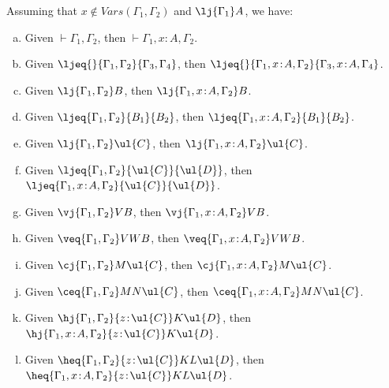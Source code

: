 \begin{theorem}[Weakening] 
\label{thm:weakening}
Assuming that $x \not\in V\!ars(\Gamma_1,\Gamma_2)$ and $\lj {\Gamma_1} A$, we have:
\label{thm:weakening}
\begin{enumerate}[(a)]
\item Given $\vdash {\Gamma_1,\Gamma_2}$, then $\vdash {\Gamma_1,x \!:\! A,\Gamma_2}$.
\item Given $\ljeq{} {\Gamma_1,\Gamma_2} {\Gamma_3,\Gamma_4}$, then $\ljeq {} {\Gamma_1,x \!:\! A,\Gamma_2} {\Gamma_3,x \!:\! A,\Gamma_4}$.
\item Given $\lj {\Gamma_1,\Gamma_2} B$, then $\lj {\Gamma_1,x \!:\! A,\Gamma_2} B$.
\item Given $\ljeq {\Gamma_1,\Gamma_2} {B_1} {B_2}$, then $\ljeq {\Gamma_1,x \!:\! A,\Gamma_2} {B_1} {B_2}$.
\item Given $\lj {\Gamma_1,\Gamma_2} \ul{C}$, then $\lj {\Gamma_1,x \!:\! A,\Gamma_2} \ul{C}$.
\item Given $\ljeq {\Gamma_1,\Gamma_2} {\ul{C}} {\ul{D}}$, then $\ljeq {\Gamma_1,x \!:\! A,\Gamma_2} {\ul{C}} {\ul{D}}$.
\item Given $\vj {\Gamma_1,\Gamma_2} V B$, then $\vj {\Gamma_1,x \!:\! A,\Gamma_2} V B$.
\item Given $\veq {\Gamma_1,\Gamma_2} V W B$, then $\veq {\Gamma_1,x \!:\! A,\Gamma_2} V W B$.
\item Given $\cj {\Gamma_1,\Gamma_2} M \ul{C}$, then $\cj {\Gamma_1,x \!:\! A,\Gamma_2} M \ul{C}$.
\item Given $\ceq {\Gamma_1,\Gamma_2} M N \ul{C}$, then $\ceq {\Gamma_1,x \!:\! A,\Gamma_2} M N \ul{C}$.
\item Given $\hj {\Gamma_1,\Gamma_2} {z \!:\! \ul{C}} K \ul{D}$, then $\hj {\Gamma_1,x \!:\! A,\Gamma_2} {z \!:\! \ul{C}} K \ul{D}$.
\item Given $\heq {\Gamma_1,\Gamma_2} {z \!:\! \ul{C}} K L \ul{D}$, then $\heq {\Gamma_1,x \!:\! A,\Gamma_2} {z \!:\! \ul{C}} K L \ul{D}$.
\end{enumerate}
\end{theorem}

